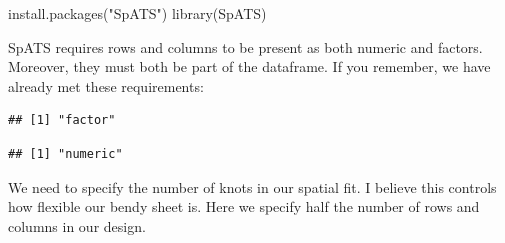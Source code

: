 \documentclass[
]{book}
\newenvironment{Shaded}{\begin{snugshade}}{\end{snugshade}}
\newcommand{\CommentTok}[1]{\textcolor[rgb]{0.56,0.35,0.01}{\textit{#1}}}
\newcommand{\DecValTok}[1]{\textcolor[rgb]{0.00,0.00,0.81}{#1}}
\newcommand{\FunctionTok}[1]{\textcolor[rgb]{0.00,0.00,0.00}{#1}}
\newcommand{\NormalTok}[1]{#1}
\newcommand{\OtherTok}[1]{\textcolor[rgb]{0.56,0.35,0.01}{#1}}
\newcommand{\SpecialCharTok}[1]{\textcolor[rgb]{0.00,0.00,0.00}{#1}}
\newcommand{\StringTok}[1]{\textcolor[rgb]{0.31,0.60,0.02}{#1}}
\begin{document}
\begin{Shaded}
\begin{Highlighting}[]
\FunctionTok{install.packages}\NormalTok{(}\StringTok{"SpATS"}\NormalTok{)}
\FunctionTok{library}\NormalTok{(SpATS)}
\end{Highlighting}
\end{Shaded}

SpATS requires rows and columns to be present as both numeric and factors. Moreover, they must both be part of the dataframe. If you remember, we have already met these requirements:

\begin{Shaded}
\end{Shaded}

\begin{verbatim}
## [1] "factor"
\end{verbatim}

\begin{Shaded}
\end{Shaded}

\begin{verbatim}
## [1] "numeric"
\end{verbatim}

We need to specify the number of knots in our spatial fit. I believe this controls how flexible our bendy sheet is. Here we specify half the number of rows and columns in our design.

\begin{Shaded}
\end{Shaded}
\end{document}
